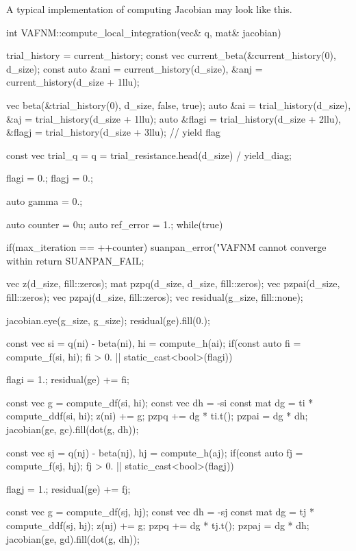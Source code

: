 A typical implementation of computing Jacobian may look like this.
\begin{cppcode}
int VAFNM::compute_local_integration(vec& q, mat& jacobian) {
    trial_history = current_history;
    const vec current_beta(&current_history(0), d_size);
    const auto &ani = current_history(d_size), &anj = current_history(d_size + 1llu);

    vec beta(&trial_history(0), d_size, false, true);
    auto &ai = trial_history(d_size), &aj = trial_history(d_size + 1llu);
    auto &flagi = trial_history(d_size + 2llu), &flagj = trial_history(d_size + 3llu); // yield flag

    const vec trial_q = q = trial_resistance.head(d_size) / yield_diag;

    flagi = 0.;
    flagj = 0.;

    auto gamma = 0.;

    auto counter = 0u;
    auto ref_error = 1.;
    while(true) {
        if(max_iteration == ++counter) {
            suanpan_error("VAFNM cannot converge within %
            return SUANPAN_FAIL;
        }

        vec z(d_size, fill::zeros);
        mat pzpq(d_size, d_size, fill::zeros);
        vec pzpai(d_size, fill::zeros);
        vec pzpaj(d_size, fill::zeros);
        vec residual(g_size, fill::none);

        jacobian.eye(g_size, g_size);
        residual(ge).fill(0.);

        {
            const vec si = q(ni) - beta(ni), hi = compute_h(ai);
            if(const auto fi = compute_f(si, hi); fi > 0. || static_cast<bool>(flagi)) {
                flagi = 1.;
                residual(ge) += fi;

                const vec g = compute_df(si, hi);
                const vec dh = -si %
                const mat dg = ti * compute_ddf(si, hi);
                z(ni) += g;
                pzpq += dg * ti.t();
                pzpai = dg * dh;
                jacobian(ge, gc).fill(dot(g, dh));
            }
        }

        {
            const vec sj = q(nj) - beta(nj), hj = compute_h(aj);
            if(const auto fj = compute_f(sj, hj); fj > 0. || static_cast<bool>(flagj)) {
                flagj = 1.;
                residual(ge) += fj;

                const vec g = compute_df(sj, hj);
                const vec dh = -sj %
                const mat dg = tj * compute_ddf(sj, hj);
                z(nj) += g;
                pzpq += dg * tj.t();
                pzpaj = dg * dh;
                jacobian(ge, gd).fill(dot(g, dh));
            }
        }

}}
\end{cppcode}
